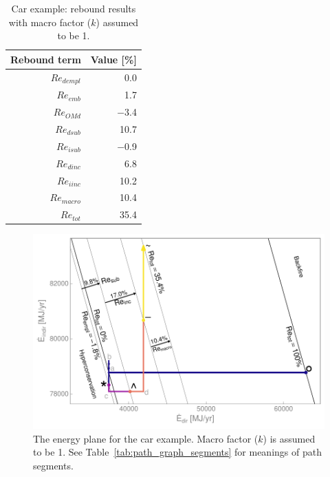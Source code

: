 \documentclass[12pt]{article}\usepackage[]{graphicx}\usepackage[]{xcolor}
\makeatletter
\def\maxwidth{ %
  \ifdim\Gin@nat@width>\linewidth
    \linewidth
  \else
    \Gin@nat@width
  \fi
}
\newenvironment{knitrout}{}{} %
\makeatother
\begin{document}
\begin{table}[ht]
\centering
\caption{Car example: rebound results with macro factor ($k$) assumed to be 1.} 
\label{tab:car_results}
\begingroup\footnotesize
\begin{tabular}{rr}
  \toprule
Rebound term & Value [\%] \\ 
  \midrule
$Re_{dempl}$ & 0.0 \\ 
  $Re_{emb}$ & 1.7 \\ 
  $Re_{O\!M\!d}$ & $-$3.4 \\ 
  $Re_{dsub}$ & 10.7 \\ 
  $Re_{isub}$ & $-$0.9 \\ 
  $Re_{dinc}$ & 6.8 \\ 
  $Re_{iinc}$ & 10.2 \\ 
  $Re_{macro}$ & 10.4 \\ 
   \midrule
$Re_{tot}$ & 35.4 \\ 
   \bottomrule
\end{tabular}
\endgroup
\end{table}










\begin{knitrout}
\color{fgcolor}\begin{figure}

{\centering \includegraphics[width=\maxwidth]{figure/CarEnergyGraph-1} 

}

\caption{The energy plane for the car example. Macro factor ($k$) is assumed to be 1. See Table~\ref{tab:path_graph_segments} for meanings of path segments.}\label{fig:CarEnergyGraph}
\end{figure}

\end{knitrout}
\end{document}
